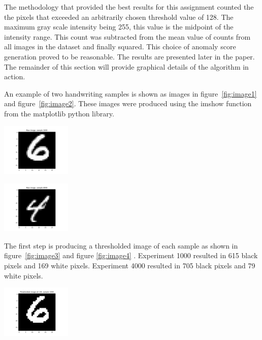 The methodology that provided the best results for this assignment counted the the pixels that exceeded an arbitrarily chosen threshold value of 128. The maximum gray scale intensity being 255, this value is the midpoint of the intensity range. This count was subtracted from the mean value of counts from all images in the dataset and finally squared. This choice of anomaly score generation proved to be reasonable. The results are presented later in the paper. The remainder of this section will provide graphical details of the algorithm in action.

An example of two handwriting samples is shown as images in figure~\ref{fig:image1} and figure~\ref{fig:image2}. These images were produced using the imshow function from the matplotlib python library.\newline

\begin{center}
\includegraphics[width=0.25\textwidth]{image1.png}
\end{center}

\begin{center}
\includegraphics[width=0.25\textwidth]{image2.png}
\end{center}

The first step is producing a thresholded image of each sample as shown in figure~\ref{fig:image3} and figure \ref{fig:image4} . Experiment 1000 resulted in 615 black pixels and 169 white pixels. Experiment 4000 resulted in 705 black pixels and 79 white pixels.

\begin{center}
\includegraphics[width=0.25\textwidth]{image3.png}
\end{center}

